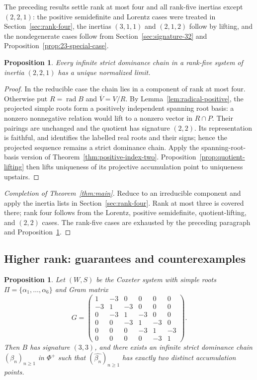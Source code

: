 \documentclass[11pt,reqno]{amsart}
\theoremstyle{plain}
\newtheorem{proposition}[theorem]{Proposition}
\theoremstyle{definition}
\theoremstyle{remark}
\numberwithin{equation}{section}
\DeclareMathOperator{\rad}{rad}
\begin{document}
The preceding results settle rank at most four and all rank-five inertias except $(2,2,1)$: the positive semidefinite and Lorentz cases were treated in Section~\ref{sec:rank-four}, the inertias $(3,1,1)$ and $(2,1,2)$ follow by lifting, and the nondegenerate cases follow from Section~\ref{sec:signature-32} and Proposition~\ref{prop:23-special-case}.
\begin{proposition}\label{prop:221-unified}
Every infinite strict dominance chain in a rank-five system of inertia $(2,2,1)$ has a unique normalized limit.
\end{proposition}
\begin{proof}
In the reducible case the chain lies in a component of rank at most four. Otherwise put $R=\rad B$ and $\overline V=V/R$. By Lemma~\ref{lem:radical-positive}, the projected simple roots form a positively independent spanning root basis: a nonzero nonnegative relation would lift to a nonzero vector in $R\cap P$. Their pairings are unchanged and the quotient has signature $(2,2)$. Its representation is faithful, and identifies the labelled real roots and their signs; hence the projected sequence remains a strict dominance chain. Apply the spanning-root-basis version of Theorem~\ref{thm:positive-index-two}. Proposition~\ref{prop:quotient-lifting} then lifts uniqueness of its projective accumulation point to uniqueness upstairs.
\end{proof}

\begin{proof}[Completion of Theorem~\ref{thm:main}]
Reduce to an irreducible component and apply the inertia lists in Section~\ref{sec:rank-four}. Rank at most three is covered there; rank four follows from the Lorentz, positive semidefinite, quotient-lifting, and $(2,2)$ cases. The rank-five cases are exhausted by the preceding paragraph and Proposition~\ref{prop:221-unified}.
\end{proof}

\subsection{Higher rank: guarantees and counterexamples}\label{subsec:higher-rank-counterexamples}
\begin{proposition}
Let $(W,S)$ be the Coxeter system with simple roots
$\Pi=\{\alpha_1,\ldots,\alpha_6\}$ and Gram matrix
\[
G=
\begin{pmatrix}
1&-3&0&0&0&0\\
-3&1&-3&0&0&0\\
0&-3&1&-3&0&0\\
0&0&-3&1&-3&0\\
0&0&0&-3&1&-3\\
0&0&0&0&-3&1
\end{pmatrix}.
\]
Then $B$ has signature $(3,3)$, and there exists an infinite strict
dominance chain $(\beta_n)_{n\geq1}$ in $\Phi^+$ such that
$(\widehat{\beta_n})_{n\geq1}$ has exactly two distinct accumulation
points.
\end{proposition}
\end{document}
